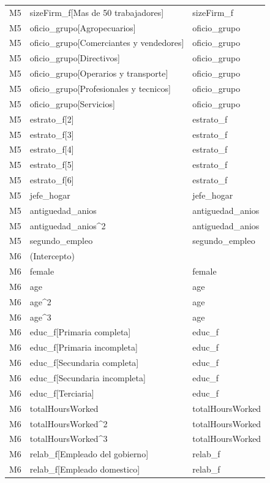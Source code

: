\begin{longtable}{lll}
M5 & sizeFirm\_f[Mas de 50 trabajadores] & sizeFirm\_f \\
M5 & oficio\_grupo[Agropecuarios] & oficio\_grupo \\
M5 & oficio\_grupo[Comerciantes y vendedores] & oficio\_grupo \\
M5 & oficio\_grupo[Directivos] & oficio\_grupo \\
M5 & oficio\_grupo[Operarios y transporte] & oficio\_grupo \\
M5 & oficio\_grupo[Profesionales y tecnicos] & oficio\_grupo \\
M5 & oficio\_grupo[Servicios] & oficio\_grupo \\
M5 & estrato\_f[2] & estrato\_f \\
M5 & estrato\_f[3] & estrato\_f \\
M5 & estrato\_f[4] & estrato\_f \\
M5 & estrato\_f[5] & estrato\_f \\
M5 & estrato\_f[6] & estrato\_f \\
M5 & jefe\_hogar & jefe\_hogar \\
M5 & antiguedad\_anios & antiguedad\_anios \\
M5 & antiguedad\_anios\textasciicircum 2 & antiguedad\_anios \\
M5 & segundo\_empleo & segundo\_empleo \\
M6 & (Intercepto) &  \\
M6 & female & female \\
M6 & age & age \\
M6 & age\textasciicircum 2 & age \\
M6 & age\textasciicircum 3 & age \\
M6 & educ\_f[Primaria completa] & educ\_f \\
M6 & educ\_f[Primaria incompleta] & educ\_f \\
M6 & educ\_f[Secundaria completa] & educ\_f \\
M6 & educ\_f[Secundaria incompleta] & educ\_f \\
M6 & educ\_f[Terciaria] & educ\_f \\
M6 & totalHoursWorked & totalHoursWorked \\
M6 & totalHoursWorked\textasciicircum 2 & totalHoursWorked \\
M6 & totalHoursWorked\textasciicircum 3 & totalHoursWorked \\
M6 & relab\_f[Empleado del gobierno] & relab\_f \\
M6 & relab\_f[Empleado domestico] & relab\_f \\

\end{longtable}

